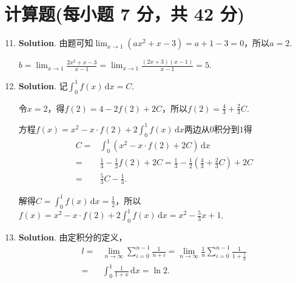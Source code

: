 \documentclass[../Main.tex]{subfiles}
\begin{document}
\section{计算题(每小题 7 分，共 42 分)}
\begin{enumerate}
    \setcounter{enumi}{10}
    \item \textbf{Solution}. 由题可知$\lim_{x\to1}\left(ax^{2}+x-3\right)=a+
              1-3=0$，所以$a=2$.

          $b=\lim_{x\to1}\frac{2x^{2}+x-3}{x-1}=\lim_{x\to1}\frac{(2x+3)(x-1)}{x-1}=5$.

    \item \textbf{Solution}. 记$\int_{0}^{1}f(x)\,\mathrm{d}x=C$.

          令$x=2$，得$f(2)=4-2f(2)+2C$，所以$f(2)=\frac{4}{3}+ \frac{2}{3}C$.

          方程$f(x)=x^{2}-x\cdot f(2)+2\int_{0}^{1}f(x)\,\mathrm{d}x$两边从$0$积分到$1$得
          \[
              \begin{aligned}
                  C = & \int_{0}^{1}\left(x^{2}-x\cdot f(2)+2C\right)\,\mathrm{d}x                                       \\
                  =   & \frac{1}{3}-\frac{1}{2}f(2)+2C = \frac{1}{3}-\frac{1}{2}\left(\frac{4}{3}+\frac{2}{3}C\right)+2C \\
                  =   & \frac{5}{3}C-\frac{1}{3}.
              \end{aligned}
          \]

          解得$C=\int_{0}^{1}f(x)\,\mathrm{d}x=\frac{1}{2}$，所以$f(x)=x^{2}-x\cdot f(2
              )+2\int_{0}^{1}f(x)\,\mathrm{d}x=x^{2}-\frac{5}{3}x+1$.

    \item \textbf{Solution}. 由定积分的定义，
          \[
              \begin{aligned}
                  l = & \lim_{n\to\infty}\sum_{i=0}^{n-1}\frac{1}{n+i}= \lim_{n\to\infty}\frac{1}{n}\sum_{i=0}^{n-1}\frac{1}{1+\frac{i}{n}} \\
                  =   & \int_{0}^{1}\frac{1}{1+x}\,\mathrm{d}x = \ln 2.
              \end{aligned}
          \]


\end{enumerate}
\end{document}
